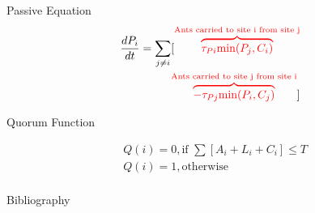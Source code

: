 \documentclass{beamer}
\makeatletter
\def\mcolor#1#{\@mcolor{#1}}
\def\@mcolor#1#2#3{%
  \protect\leavevmode
  \begingroup
    \color#1{#2}#3%
  \endgroup
}
\newcommand{\annotate}[3]{
\mcolor{#1}{\overbrace{#3}^\text{#2}}
}
\makeatother
\begin{document}
\begin{frame}{Passive Equation}
\begin{equation}
\begin{aligned}
    \frac{dP_i}{dt} = \sum_{j \neq i} [\annotate{red}{Ants carried to site i from site j}{\tau_{Pi}\text{min}(P_j, C_i)} \\ \annotate{red}{Ants carried to site j from site i}{- \tau_{Pj}\text{min}(P_i, C_j)}]
\end{aligned}
\end{equation}

\end{frame}

\begin{frame}{Quorum Function}


\begin{equation}
\begin{aligned}
  & Q(i) = 0, \text{if    } \sum [A_i + L_i + C_i] \leq T \\
  & Q(i) = 1, \text{otherwise} \\
\end{aligned}
\end{equation}
\end{frame}

  \begin{frame}{Bibliography}
      
  \end{frame}
\end{document}
